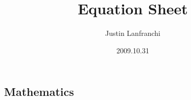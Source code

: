 \documentclass[letterpaper,landscape,10pt]{article}
\title{Equation Sheet}
\author{Justin Lanfranchi}
\date{2009.10.31}
\newif\iftechexplorer\techexplorerfalse
\begin{document}
{
\raggedright

\fontsize{7}{1}\selectfont %
\begin{multicols}{3}
\iftechexplorer
  \maketitle
\fi

\section*{Mathematics}
%



\end{multicols}}
\end{document}
